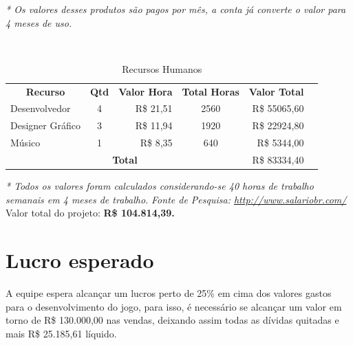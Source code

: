 \documentclass[11pt]{article} %
\begin{document}
\textit{* Os valores desses produtos são pagos por mês, a conta já converte o valor para 4 meses de uso.}
\newpage

\
\begin{table}[h]
\centering
\begin{tabular}{|l|l|l|l|l|l}
\cline{1-5}
\multicolumn{1}{|c|}{\textbf{Recurso}} & \multicolumn{1}{c|}{\textbf{Qtd}} & \multicolumn{1}{c|}{\textbf{Valor Hora}} & \multicolumn{1}{c|}{\textbf{Total Horas}} & \multicolumn{1}{c|}{\textbf{Valor Total}} &  \\ \cline{1-5}
Desenvolvedor                          & \multicolumn{1}{c|}{4}            & \multicolumn{1}{r|}{R\$ 21,51}    		  & \multicolumn{1}{c|}{2560}	      		  & \multicolumn{1}{r|}{R\$ 55065,60}         &  \\ \cline{1-5}
Designer Gráfico                       & \multicolumn{1}{c|}{3}            & \multicolumn{1}{r|}{R\$ 11,94}    		  & \multicolumn{1}{c|}{1920}	      		  & \multicolumn{1}{r|}{R\$ 22924,80}         &  \\ \cline{1-5}
Músico                                 & \multicolumn{1}{c|}{1}            & \multicolumn{1}{r|}{R\$ 8,35}     		  & \multicolumn{1}{c|}{640}			      & \multicolumn{1}{r|}{R\$ 5344,00}          &  \\ \cline{1-5}
\multicolumn{4}{|c|}{\textbf{Total}}                                                                                         									  & \multicolumn{1}{r|}{R\$ 83334,40}         &  \\ \cline{1-5}
\end{tabular}
\caption {Recursos Humanos}
\end{table}

\textit{* Todos os valores foram calculados considerando-se 40 horas de trabalho semanais em 4 meses de trabalho.}
\textit{Fonte de Pesquisa: \url{http://www.salariobr.com/}}
\\

Valor total do projeto: {\textbf{R\$ 104.814,39.}}

\section{Lucro esperado}

A equipe espera alcançar um lucros perto de 25\% em cima dos valores gastos para o desenvolvimento do jogo, para isso, é necessário se alcançar um valor em torno de R\$ 130.000,00 nas vendas, deixando assim todas as dívidas quitadas e mais R\$ 25.185,61 líquido.
\end{document}
